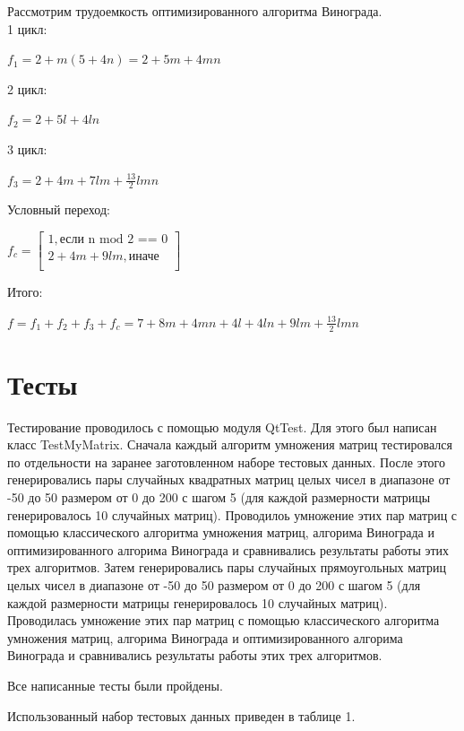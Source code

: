 \documentclass[a4paper,14pt]{report}
\begin{document}
Рассмотрим трудоемкость оптимизированного алгоритма Винограда.\\

1 цикл:

$f_{1} = 2 + m(5 + 4n) = 2 + 5m + 4mn$

2 цикл:

$f_{2} = 2 + 5l + 4 ln$

3 цикл:

$f_{3} = 2 + 4m + 7lm + \frac{13}{2}lmn$

Условный переход:

$f_{c} = \begin{bmatrix}
1, \text{если n mod 2 == 0} \\
2 + 4m + 9lm, \text{иначе} \\
\end{bmatrix}$

Итого:

$f = f_{1} + f_{2} + f_{3} + f_{c} = 7 + 8m + 4mn + 4l + 4ln + 9lm + \frac{13}{2}lmn$

\section*{Тесты}

Тестирование проводилось с помощью модуля QtTest. Для этого был написан класс TestMyMatrix. Сначала каждый алгоритм умножения матриц тестировался по отдельности на заранее заготовленном наборе тестовых данных.
После этого генерировались пары случайных квадратных матриц целых чисел в диапазоне от -50 до 50 размером от 0 до 200 с шагом 5 (для каждой размерности матрицы генерировалось 10 случайных матриц). Проводилоь умножение этих пар матриц с помощью классического алгоритма умножения матриц, алгорима Винограда и оптимизированного алгорима Винограда и сравнивались результаты работы этих трех алгоритмов. Затем генерировались пары случайных прямоугольных матриц целых чисел в диапазоне от -50 до 50 размером от 0 до 200 с шагом 5 (для каждой размерности матрицы генерировалось 10 случайных матриц). Проводилась умножение этих пар матриц с помощью классического алгоритма умножения матриц, алгорима Винограда и оптимизированного алгорима Винограда и сравнивались результаты работы этих трех алгоритмов.

Все написанные тесты были пройдены.

Использованный набор тестовых данных приведен в таблице 1.
\end{document}
